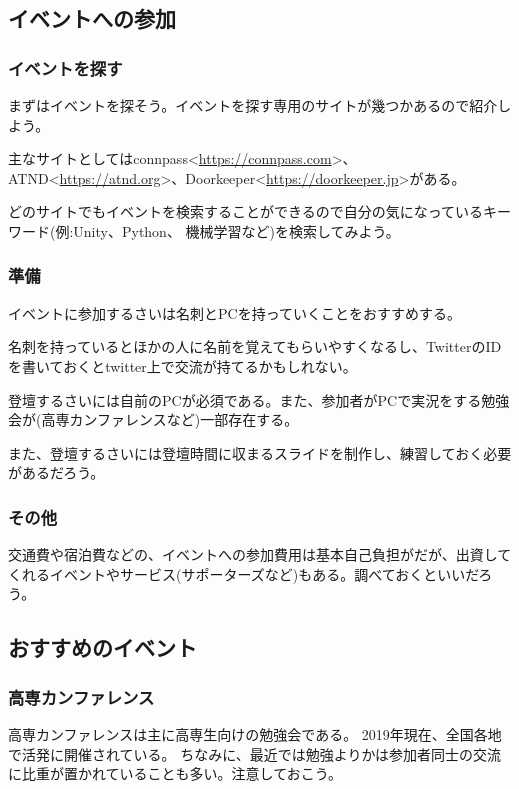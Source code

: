 \documentclass[lualatex,ja=standard,12pt,a4j]{bxjsbook}
\begin{document}
			\subsection{イベントへの参加}
				\subsubsection{イベントを探す}
					まずはイベントを探そう。イベントを探す専用のサイトが幾つかあるので紹介しよう。
					
					主なサイトとしてはconnpass<\url{https://connpass.com}>、ATND<\url{https://atnd.org}>、Doorkeeper<\url{https://doorkeeper.jp}>がある。
					
					どのサイトでもイベントを検索することができるので自分の気になっているキーワード(例:Unity、Python、 機械学習など)を検索してみよう。
				\subsubsection{準備}
					イベントに参加するさいは名刺とPCを持っていくことをおすすめする。
					
					名刺を持っているとほかの人に名前を覚えてもらいやすくなるし、TwitterのIDを書いておくとtwitter上で交流が持てるかもしれない。
					
					登壇するさいには自前のPCが必須である。また、参加者がPCで実況をする勉強会が(高専カンファレンスなど)一部存在する。
					
					また、登壇するさいには登壇時間に収まるスライドを制作し、練習しておく必要があるだろう。
					
					\subsubsection{その他}
						交通費や宿泊費などの、イベントへの参加費用は基本自己負担がだが、出資してくれるイベントやサービス(サポーターズなど)もある。調べておくといいだろう。
			\subsection{おすすめのイベント}
				\subsubsection{高専カンファレンス}
					高専カンファレンスは主に高専生向けの勉強会である。
					2019年現在、全国各地で活発に開催されている。
					ちなみに、最近では勉強よりかは参加者同士の交流に比重が置かれていることも多い。注意しておこう。
					
\end{document}
